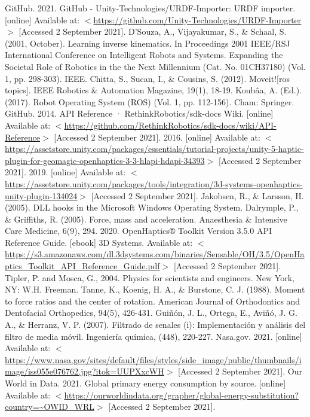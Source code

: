 \begin{thebibliography}{2}
	 GitHub. 2021. GitHub - Unity-Technologies/URDF-Importer: URDF importer. [online] Available at: $<$\url{https://github.com/Unity-Technologies/URDF-Importer}$>$ [Accessed 2 September 2021].
	 D'Souza, A., Vijayakumar, S., \& Schaal, S. (2001, October). Learning inverse kinematics. In Proceedings 2001 IEEE/RSJ International Conference on Intelligent Robots and Systems. Expanding the Societal Role of Robotics in the the Next Millennium (Cat. No. 01CH37180) (Vol. 1, pp. 298-303). IEEE.
	 Chitta, S., Sucan, I., \& Cousins, S. (2012). Moveit![ros topics]. IEEE Robotics \& Automation Magazine, 19(1), 18-19.
	 Koubâa, A. (Ed.). (2017). Robot Operating System (ROS) (Vol. 1, pp. 112-156). Cham: Springer.
	 GitHub. 2014. API Reference · RethinkRobotics/sdk-docs Wiki. [online] Available at: $<$\url{https://github.com/RethinkRobotics/sdk-docs/wiki/API-Reference}$>$ [Accessed 2 September 2021].
	 2016. [online] Available at: $<$\url{https://assetstore.unity.com/packages/essentials/tutorial-projects/unity-5-haptic-plugin-for-geomagic-openhaptics-3-3-hlapi-hdapi-34393}$>$ [Accessed 2 September 2021].
	 2019. [online] Available at: $<$\url{https://assetstore.unity.com/packages/tools/integration/3d-systems-openhaptics-unity-plugin-134024}$>$ [Accessed 2 September 2021].
	 Jakobsen, R., \& Larsson, H. (2005). DLL hooks in the Microsoft Windows Operating System.
	 Dalrymple, P., \& Griffiths, R. (2005). Force, mass and acceleration. Anaesthesia \& Intensive Care Medicine, 6(9), 294.
	 2020. OpenHaptics® Toolkit Version 3.5.0 API Reference Guide. [ebook] 3D Systems. Available at: $<$\url{https://s3.amazonaws.com/dl.3dsystems.com/binaries/Sensable/OH/3.5/OpenHaptics\_Toolkit\_API\_Reference\_Guide.pdf}$>$ [Accessed 2 September 2021].
	 Tipler, P. and Mosca, G., 2004. Physics for scientists and engineers. New York, NY: W.H. Freeman.
	 Tanne, K., Koenig, H. A., \& Burstone, C. J. (1988). Moment to force ratios and the center of rotation. American Journal of Orthodontics and Dentofacial Orthopedics, 94(5), 426-431.
	 Guiñón, J. L., Ortega, E., Aviñó, J. G. A., \& Herranz, V. P. (2007). Filtrado de senales (i): Implementación y análisis del filtro de media móvil. Ingeniería química, (448), 220-227.
	 Nasa.gov. 2021. [online] Available at: $<$\url{https://www.nasa.gov/sites/default/files/styles/side\_image/public/thumbnails/image/iss055e076762.jpg?itok=UUPXxcWH}$>$ [Accessed 2 September 2021].
	 Our World in Data. 2021. Global primary energy consumption by source. [online] Available at: $<$\url{https://ourworldindata.org/grapher/global-energy-substitution?country=~OWID\_WRL}$>$ [Accessed 2 September 2021].

\end{thebibliography}
